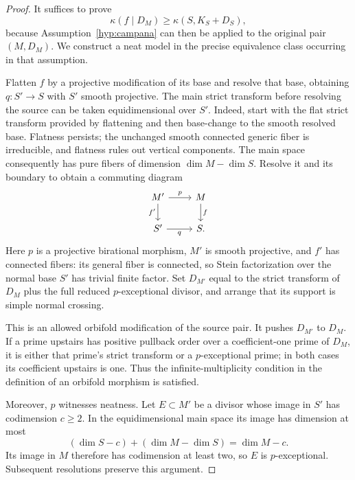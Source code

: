 \documentclass[11pt,letterpaper]{article}
\theoremstyle{definition}
\theoremstyle{remark}
\begin{document}
\begin{proof}
It suffices to prove
\begin{equation}\label{red:invariant-base-bound}
 \kappa(f\mid D_M)\geq\kappa(S,K_S+D_S),
\end{equation}
because Assumption~\ref{hyp:campana} can then be applied to the original
pair \((M,D_M)\). We construct a neat model in the precise equivalence
class occurring in that assumption.

Flatten \(f\) by a projective modification of its base and resolve that
base, obtaining \(q:S'\to S\) with \(S'\) smooth projective. The main
strict transform before resolving the source can be taken
equidimensional over \(S'\). Indeed, start with the flat strict transform
provided by flattening and then base-change to the smooth resolved
base. Flatness persists; the unchanged smooth connected generic fiber
is irreducible, and flatness rules out vertical components. The main
space consequently has pure fibers of dimension \(\dim M-\dim S\).
Resolve it and its boundary to obtain a commuting diagram
\[
\begin{tikzcd}
 M' \arrow[r,"p"] \arrow[d,"f'"'] & M \arrow[d,"f"]\\
 S' \arrow[r,"q"'] & S .
\end{tikzcd}
\]
Here \(p\) is a projective birational morphism, \(M'\) is smooth
projective, and \(f'\) has connected fibers: its general fiber is
connected, so Stein factorization over the normal base \(S'\) has trivial
finite factor. Set \(D_{M'}\) equal to the strict transform of \(D_M\)
plus the full reduced \(p\)-exceptional divisor, and arrange that its
support is simple normal crossing.

This is an allowed orbifold modification of the source pair. It pushes
\(D_{M'}\) to \(D_M\). If a prime upstairs has positive pullback order
over a coefficient-one prime of \(D_M\), it is either that prime's
strict transform or a \(p\)-exceptional prime; in both cases its
coefficient upstairs is one. Thus the infinite-multiplicity condition
in the definition of an orbifold morphism is satisfied.

Moreover, \(p\) witnesses neatness. Let \(E\subset M'\) be a divisor
whose image in \(S'\) has codimension \(c\geq2\). In the equidimensional
main space its image has dimension at most
\[
 (\dim S-c)+(\dim M-\dim S)=\dim M-c.
\]
Its image in \(M\) therefore has codimension at least two, so \(E\) is
\(p\)-exceptional. Subsequent resolutions preserve this argument.


\end{proof}
\end{document}
